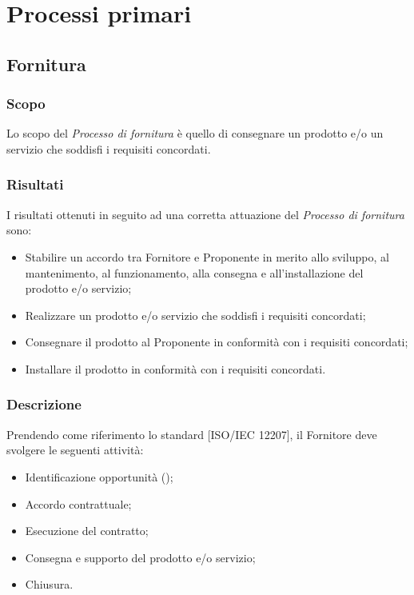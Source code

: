 \documentclass[../NormeDiProgetto.tex]{subfiles}
\begin{document}
	\section{Processi primari}
		\subsection{Fornitura}
			\subsubsection{Scopo}
				Lo scopo del \textit{Processo di fornitura} è quello di consegnare un prodotto e/o un
				servizio che soddisfi i requisiti concordati.
			\subsubsection{Risultati}
				I risultati ottenuti in seguito ad una corretta attuazione del
				\textit{Processo di fornitura} sono:
				\begin{itemize}
					\item Stabilire un accordo tra Fornitore e Proponente in merito allo sviluppo, al
					mantenimento, al funzionamento, alla consegna e all'installazione del prodotto
					e/o servizio;
					\item Realizzare un prodotto e/o servizio che soddisfi i requisiti concordati;
					\item Consegnare il prodotto al Proponente in conformità con i requisiti
					concordati;
					\item Installare il prodotto in conformità con i requisiti concordati.
				\end{itemize}
			\subsubsection{Descrizione}
				Prendendo come riferimento lo standard [ISO/IEC 12207], il Fornitore deve svolgere le seguenti
				attività:
				\begin{itemize}
					\item Identificazione opportunità (\studiodifattibilita);
					\item Accordo contrattuale;
					\item Esecuzione del contratto;
					\item Consegna e supporto del prodotto e/o servizio;
					\item Chiusura.
				\end{itemize}
\end{document}
